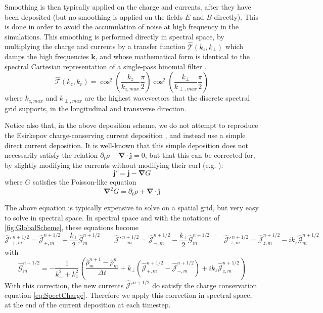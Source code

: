 \documentclass[1p,times]{elsarticle}
\renewcommand{\vec}[1]{\boldsymbol{#1}}
\newcommand{\spectral}[1]{\hat{\mathcal{#1}}}
\begin{document}
Smoothing is then typically applied on the charge and currents, after they
have been deposited (but no smoothing is applied on the
fields $E$ and $B$ directly). This is done in order to avoid the accumulation
of noise at high frequency in the simulations. This smoothing
is performed directly in spectral space, by multiplying the charge
and currents by a transfer function $\spectral{T}(k_z, k_\perp)$ which
damps the high frequencies $\vec{k}$, and whose mathematical form is
identical to the spectral Cartesian representation of a single-pass
binomial filter \citep{Birdsall2004}.
\begin{equation} \spectral{T}(k_z, k_r) = \cos^2 \left( \frac{k_z}{k_{z,max}}\frac{\pi}{2} \right)
\cos^2\left( \frac{k_\perp}{k_{\perp,max}}\frac{\pi}{2} \right) \end{equation}
\noindent where $k_{z, max}$ and $k_{\perp,max}$ are the highest
wavevectors that the discrete spectral grid supports, in the
longitudinal and transverse direction.

Notice also that, in the above deposition scheme, we do not attempt to
reproduce the Esirkepov charge-conserving current deposition
\citep{Esirkepov}, and instead use a
simple direct current deposition. It is well-known that this simple deposition does not necessarily
satisfy the relation $\partial_t\rho + \vec{\nabla}\cdot\vec{j} =
0$, but that this can be corrected for, by slightly modifying the
currents without modifying their curl (e.g. \cite{VayJCP2013}):
\begin{equation} \vec{j}' = \vec{j} - \vec{\nabla} G \end{equation}
where $G$ satisfies the Poisson-like equation
\begin{equation} \vec{\nabla}^2 G = \partial_t\rho + \vec{\nabla}\cdot\vec{j} \end{equation}

The above equation is typically expensive to solve on a spatial grid, but
very easy to solve in spectral space. In spectral space and with the
notations of \cref{fig:GlobalScheme}, these equations become
\begin{equation} \spectral{J}'^{\,n+1/2}_{+,m} = \spectral{J}^{n+1/2}_{+,m} +
\frac{k_\perp}{2} \spectral{G}^{n+1/2}_m
\qquad
\spectral{J}'^{\,n+1/2}_{-,m} = \spectral{J}^{n+1/2}_{-,m} - \frac{k_\perp}{2} \spectral{G}^{n+1/2}_m
\qquad \spectral{J}'^{\,n+1/2}_{z,m} = \spectral{J}^{n+1/2}_{z,m} - ik_z
\spectral{G}^{n+1/2}_m\end{equation}
with
\begin{equation} \spectral{G}^{n+1/2}_m = - \frac{1}{k_\perp^2 + k_z^2}\left(
  \frac{\spectral{\rho}^{n+1}_m -\spectral{\rho}^{n}_m}{\Delta t} + k_\perp
  (\spectral{J}^{n+1/2}_{+,m} -\spectral{J}^{n+1/2}_{-,m}) + ik_z\spectral{J}^{n+1/2}_{z,m}  \right) \end{equation}
With this correction, the new currents $\spectral{J}'^{n+1/2}$ do satisfy
the charge conservation equation \cref{eq:SpectCharge}. Therefore we apply this
correction in spectral space, at the end of the current deposition at each timestep.
\end{document}
